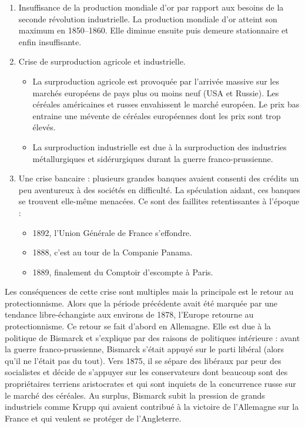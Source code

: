 \documentclass[12pt]{report}
\begin{document}
\begin{enumerate}
	\item Insuffisance de la production mondiale d’or par rapport aux besoins de la seconde
révolution industrielle. La production mondiale d’or atteint son maximum en 1850--1860. Elle diminue ensuite puis demeure stationnaire et enfin insuffisante.
\item Crise de surproduction agricole et industrielle.
	\begin{itemize}
		\item La surproduction agricole est provoquée par l’arrivée massive sur les marchés
européens de pays plus ou moins neuf (USA et Russie). Les céréales
américaines et russes envahissent le marché européen. Le prix bas entraine une
mévente de céréales européennes dont les prix sont trop élevés.
\item La surproduction industrielle est due à la surproduction des industries
métallurgiques et sidérurgiques durant la guerre franco-prussienne.
	\end{itemize}
\item Une crise bancaire : plusieurs grandes banques avaient consenti des crédits un peu
aventureux à des sociétés en difficulté. La spéculation aidant, ces banques se trouvent
elle-même menacées. Ce sont des faillites retentissantes à l’époque :
		\begin{itemize}
			\item 1892, l’Union Générale de France s’effondre.
			\item 1888, c'est au tour de la Companie Panama.
			\item 1889, finalement du Comptoir d'escompte à Paris.
		\end{itemize}
\end{enumerate}

Les conséquences de cette crise sont multiples mais la principale est le retour au
protectionnisme. Alors que la période précédente avait été marquée par une tendance libre-échangiste aux environs de 1878, l’Europe retourne au protectionnisme. Ce retour se fait
d’abord en Allemagne. Elle est due à la politique de Bismarck et s’explique par des raisons de
politiques intérieure : avant la guerre franco-prussienne, Bismarck s’était appuyé sur le parti
libéral (alors qu’il ne l’était pas du tout). Vers 1875, il se sépare des libéraux par peur des
socialistes et décide de s’appuyer sur les conservateurs dont beaucoup sont des propriétaires
terriens aristocrates et qui sont inquiets de la concurrence russe sur le marché des céréales. Au
surplus, Bismarck subit la pression de grands industriels comme Krupp qui avaient contribué
à la victoire de l’Allemagne sur la France et qui veulent se protéger de l’Angleterre.
\end{document}
